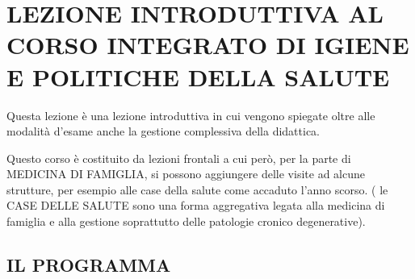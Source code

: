 \section{LEZIONE INTRODUTTIVA AL CORSO INTEGRATO DI IGIENE E POLITICHE DELLA SALUTE}


Questa lezione è una lezione introduttiva in cui vengono spiegate oltre
alle modalità d'esame anche la gestione complessiva della didattica.

Questo corso è costituito da lezioni frontali a cui però, per la parte
di MEDICINA DI FAMIGLIA, si possono aggiungere delle visite ad alcune
strutture, per esempio alle case della salute come accaduto l'anno
scorso. ( le CASE DELLE SALUTE sono una forma aggregativa legata alla
medicina di famiglia e alla gestione soprattutto delle patologie cronico
degenerative).

\subsection{IL PROGRAMMA}


